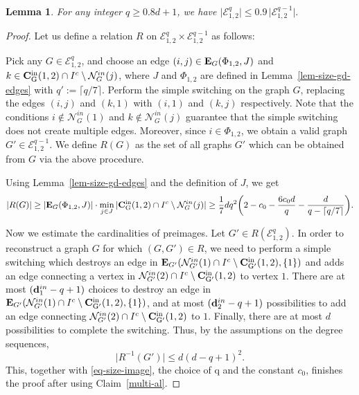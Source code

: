 \documentclass[12pt]{article}
\newtheorem{lemma}[theorem]{Lemma}
\theoremstyle{definition}
\theoremstyle{plain}
\newcommand{\Event}{\mathcal{E}}
\def\nrangr{G}
\def\inco{{\rm {\bf C}_{\nrangr}^{in}}}
\def\incopr{{\rm {\bf C}_{\nrangr'}^{in}}}
\def\innbr{{\mathcal N}_{\nrangr}^{in}}
\def\innbrpr{{\mathcal N}_{\nrangr'}^{in}}
\def\edg{{\bf E}_{\nrangr}}
\def\edgpr{{\bf E}_{\nrangr'}}
\def\InDeg{{\bf d}^{in}}
\begin{document}
\begin{lemma}
For any integer $q\geq 0.8d+1$, we have
$\vert \Event_{1,2}^q\vert \leq 0.9 \, \vert \Event_{1,2}^{q-1}\vert .$
\end{lemma}
\begin{proof}
Let us define a relation $R$ on $\Event_{1,2}^{q}\times \Event_{1,2}^{q-1}$ as follows:
 
Pick any $\nrangr\in  \Event_{1,2}^{q}$, and choose an edge $(i,j)\in \edg(\Phi_{1,2}, J)$
and $k\in \inco(1,2)\cap I^c\setminus \innbr(j)$,
where $J$ and $\Phi_{1,2}$ are defined in Lemma~\ref{lem-size-gd-edges} with $q':=\lceil q/7\rceil$. 
Perform the simple switching on the graph $\nrangr$, replacing the edges $(i,j)$ and $(k,1)$ with $(i,1)$ and $(k,j)$ respectively.
Note that the conditions $i\not\in\innbr(1)$ and $k\not\in \innbr(j)$
guarantee that the simple switching does not create multiple edges.
Moreover, since $i\in \Phi_{1,2}$, we obtain a valid graph $\nrangr'\in\Event_{1,2}^{q-1}$.  
We define $R(\nrangr)$ as the set of all graphs $\nrangr'$ which can be obtained from $\nrangr$
via the above procedure.

Using Lemma~\ref{lem-size-gd-edges} and the definition of $J$, we get 
\begin{equation}\label{eq-size-image}
\vert R(\nrangr)\vert \geq \vert \edg(\Phi_{1,2}, J)\vert\cdot \min\limits_{j\in J}\vert \inco(1,2)\cap I^c\setminus \innbr(j)\vert
\geq
\frac{1}{7} dq^2\biggl(2-c_0-\frac{6c_0d}{q}-\frac{d}{q-\lceil q/7\rceil}\biggr).
\end{equation}

Now we estimate the cardinalities of preimages. Let $\nrangr'\in R(\Event_{1,2}^q)$.
In order to reconstruct a graph $\nrangr$ for which $(\nrangr,\nrangr')\in R$, 
we need to perform a simple switching which destroys an edge in $\edgpr(\innbrpr(1)\cap I^c\setminus \incopr(1,2), \{1\})$
and adds an edge connecting a vertex in $\innbrpr(2)\cap I^c\setminus \incopr(1,2)$ to vertex $1$. 
There are at most $(\InDeg_1-q+1)$ choices to destroy an edge in $\edgpr(\innbrpr(1)\cap I^c\setminus \incopr(1,2), \{1\})$,
and at most $(\InDeg_2-q+1)$ possibilities to add an edge connecting $\innbrpr(2)\cap I^c\setminus \incopr(1,2)$ 
to $1$. Finally, there are at most $d$ possibilities to complete the switching. Thus,
by the assumptions on the degree sequences,
$$
\vert R^{-1}(\nrangr')\vert \leq d(d-q+1)^2.
$$
This, together with \eqref{eq-size-image}, the choice of q and the constant $c_0$, 
finishes the proof after using Claim~\ref{multi-al}.
\end{proof}
\end{document}
